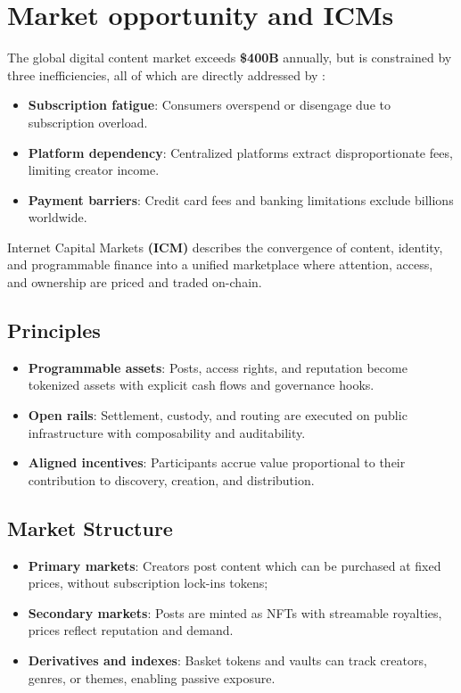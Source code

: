 \documentclass[10pt]{article}
\begin{document}
  \section{Market opportunity and ICMs}
    The global digital content market exceeds \textbf{\$400B} annually, but is constrained by three inefficiencies, all of which are directly addressed by \textbf{\projectname}:
    \begin{itemize}[leftmargin=*]
      \item \textbf{Subscription fatigue}: Consumers overspend or disengage due to subscription overload.
      \item \textbf{Platform dependency}: Centralized platforms extract disproportionate fees, limiting creator income.
      \item \textbf{Payment barriers}: Credit card fees and banking limitations exclude billions worldwide.
    \end{itemize}

    Internet Capital Markets \textbf{(ICM)} describes the convergence of content, identity, and programmable finance into a unified marketplace where attention, access, and ownership are priced and traded on-chain.

    \subsection{Principles}
      \begin{itemize}[leftmargin=*]
      \item \textbf{Programmable assets}: Posts, access rights, and reputation become tokenized assets with explicit cash flows and governance hooks.
      \item \textbf{Open rails}: Settlement, custody, and routing are executed on public infrastructure with composability and auditability.
      \item \textbf{Aligned incentives}: Participants accrue value proportional to their contribution to discovery, creation, and distribution.
    \end{itemize}

    \subsection{Market Structure}
      \begin{itemize}[leftmargin=*]
        \item \textbf{Primary markets}: Creators post content which can be purchased at fixed prices, without subscription lock-ins tokens; 
        \item \textbf{Secondary markets}: Posts are minted as NFTs with streamable royalties, prices reflect reputation and demand.
        \item \textbf{Derivatives and indexes}: Basket tokens and vaults can track creators, genres, or themes, enabling passive exposure.
      \end{itemize}
\end{document}
